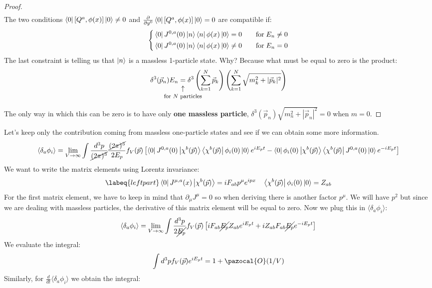 \documentclass[../main.tex]{subfiles}
\begin{document}
\begin{proof}
\begin{align*}
\end{align*}
The two conditions $\bra{0}[Q^a,\phi(x)]\ket{0}\neq0$ and $\frac{\partial}{\partial y^0}\bra{0}[Q^a,\phi(x)]\ket{0}=0$ are compatible if:
\[
\left\{
\begin{aligned}
&\bra{0}J^{0,a}(0)\ket{n}\bra{n}\phi(x)\ket{0}=0\quad &&\text{for}\;E_n\neq0\\
&\bra{0}J^{0,a}(0)\ket{n}\bra{n}\phi(x)\ket{0}\neq0\quad &&\text{for}\;E_n=0
\end{aligned}
\right.
\]
The last constraint is telling us that $\ket{n}$ is a massless 1-particle state. Why? Because what must be equal to zero is the product:
\[
\delta^3(\Vec{p}_n)E_n\underset{\mathclap{\tikz \node {$\uparrow$} node [below=1ex] {\footnotesize for $N$ particles };}}{=}\delta^3\left(\sum_{k=1}^N\Vec{p}_k\right)\left(\sum_{k=1}^N\sqrt{m_k^2+|\Vec{p}_k|^2}\right)
\]
The only way in which this can be zero is to have only \textbf{one massless particle}, $\delta^3(\Vec{p}_n)\sqrt{m_n^2+|\Vec{p}_n|^2}=0$ when $m=0$.    
\end{proof}
Let's keep only the contribution coming from massless one-particle states and see if we can obtain some more information.
\[
\langle\delta_a\phi_i\rangle=\lim_{V\to\infty}\int\frac{d^3p}{\cancel{(2\pi)^3}}\frac{\cancel{(2\pi)^3}}{2E_p}f_V(\Vec{p})\left[\bra{0}J^{0,a}(0)\ket{\chi^b(\Vec{p})}\bra{\chi^b(\Vec{p})}\phi_i(0)\ket{0}e^{iE_pt}-\bra{0}\phi_i(0)\ket{\chi^b(\Vec{p})}\bra{\chi^b(\Vec{p})}J^{0,a}(0)\ket{0}e^{-iE_pt}\right]
\]
We want to write the matrix elements using Lorentz invariance:
\begin{equation}
\labeq{leftpart}
\bra{0}J^{\mu,a}(x)\ket{\chi^b(\Vec{p})}=iF_{ab}p^\mu e^{ipx} \quad \bra{\chi^b(\Vec{p})}\phi_i(0)\ket{0}=Z_{ab}
\end{equation}
For the first matrix element, we have to keep in mind that $\partial_\mu J^\mu=0$ so when deriving there is another factor $p^\mu$. We will have $p^2$ but since we are dealing with massless particles, the derivative of this matrix element will be equal to zero. Now we plug this in $\langle\delta_a\phi_i\rangle$:
\[
\langle\delta_a\phi_i\rangle=\lim_{V\to\infty}\int\frac{d^3p}{2\cancel{E_p}}f_V(\Vec{p})\left[iF_{ab}\cancel{E_p}Z_{ab}e^{iE_pt}+iZ_{ab}F_{ab}\cancel{E_p}e^{-iE_pt}\right]
\]
We evaluate the integral:
\[
\int d^3pf_V(\Vec{p})e^{iE_pt}=1+\pazocal{O}(1/V)
\]
Similarly, for $\frac{d}{dt}\langle\delta_a\phi_i\rangle$ we obtain the integral:
\end{document}
